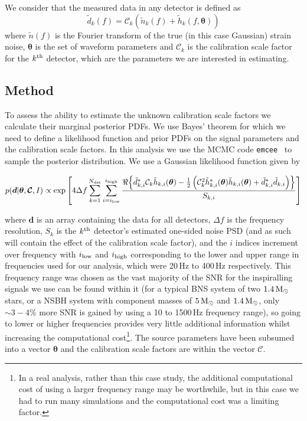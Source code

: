 \documentclass[prd, twocolumn, lengthcheck, superscriptaddress, showpacs, letterpaper, nofootinbib]{revtex4-1}
\newcommand{\gws}{\tilde{h}}
\newcommand{\scf}{\ensuremath{\mathcal{C}}}
\newcommand{\btheta}{\bm{\theta}}
\begin{document}
We consider that the measured data in any detector is defined as
%
\begin{equation}
  \tilde{d}_{k}(f)=\scf_{k}(\tilde{n}_{k}(f)+\gws_{k}(f,\btheta))
\end{equation}
%
where $\tilde{n}(f)$ is the Fourier transform of the true (in this case
Gaussian) strain noise, $\btheta$ is the set of waveform parameters and
$\scf_k$ is the calibration scale factor for the $k^{\rm th}$ detector, which are the
parameters we are interested in estimating.

\subsection{Method}

To assess the ability to estimate the unknown calibration scale factors we
calculate their marginal posterior \acp{PDF}.  We use Bayes' theorem for which
we need to define a likelihood function and prior \acp{PDF} on the signal
parameters and the calibration scale factors. In this analysis we use the
\ac{MCMC} code {\tt emcee}~\cite{2013PASP..125..306F} to sample
the posterior distribution. We use a Gaussian likelihood function given by
%
\begin{widetext}
\begin{equation}
p(\bm{d} | \btheta, \bm{\scf}, I) \propto \exp{\left[4\Delta f \sum_{k=1}^{N_{\rm 
det}}
  \sum_{i=i_{\rm low}}^{i_{\rm high}}\frac{\Re{\left\{ \tilde{d}^{*}_{k,i} 
\scf_{k}\gws_{k,i}(\btheta) - \frac{1}{2}\left(\scf_k^2 \gws^*_{k,i}(\btheta)\gws_{k,i}(\btheta) + 
\tilde{d}^*_{k,i}\tilde{d}_{k,i}\right) \right\}}}{S_{k,i}}\right]}
\end{equation}
\end{widetext}
%
where $\bm{d}$ is an array containing the data for all detectors, $\Delta f$ is
the frequency resolution, $S_k$ is the $k^{\rm th}$ detector's estimated
one-sided noise \ac{PSD} (and as such will contain the effect of the
calibration scale factor), and the $i$ indices increment over frequency with
$i_{\rm low}$ and $i_{\rm high}$ corresponding to the lower and upper range in
frequencies used for our analysis, which were 20\,Hz to 400\,Hz respectively.
This frequency range was chosen as the vast majority of the \ac{SNR} for the
inspiralling signals we use can be found within it (for a typical \ac{BNS}
system of two $1.4\,{\rm M_{\odot}}$ stars, or a \ac{NSBH} system with component masses of
$5\,{\rm M_{\odot}}$ and $1.4\,{\rm M_{\odot}}$, only $\sim 3-4\%$ more \ac{SNR} is gained
by using a 10 to 1500\,Hz frequency range), so going to lower
or higher frequencies provides very little additional information whilst increasing
the computational cost\footnote{In a real analysis, rather than this case study, the additional
computational cost of using a larger frequency range may be worthwhile, but in this case we had
to run many simulations and the computational cost was a limiting factor.}. The source
parameters have been subsumed into a vector $\btheta$ and the calibration scale
factors are within the vector $\bm{\scf}$.
\end{document}
